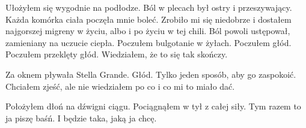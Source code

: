 Ułożyłem się wygodnie na podłodze.
Ból w plecach był ostry i przeszywający.
Każda komórka ciała poczęła mnie boleć.
Zrobiło mi się niedobrze i dostałem najgorszej migreny w życiu, albo i po życiu w tej chili.
Ból powoli ustępował, zamieniany na uczucie ciepła.
Poczułem bulgotanie w żyłach.
Poczułem głód.
Poczułem przeklęty głód.
Wiedziałem, że to się tak skończy.

Za oknem pływała Stella Grande. Głód. Tylko jeden sposób, aby go zaspokoić.
Chciałem zjeść, ale nie wiedziałem po co i co mi to miało dać.

Położyłem dłoń na dźwigni ciągu.
Pociągnąłem w tył z całej siły.
Tym razem to ja piszę baśń.
I będzie taka, jaką ja chcę.



